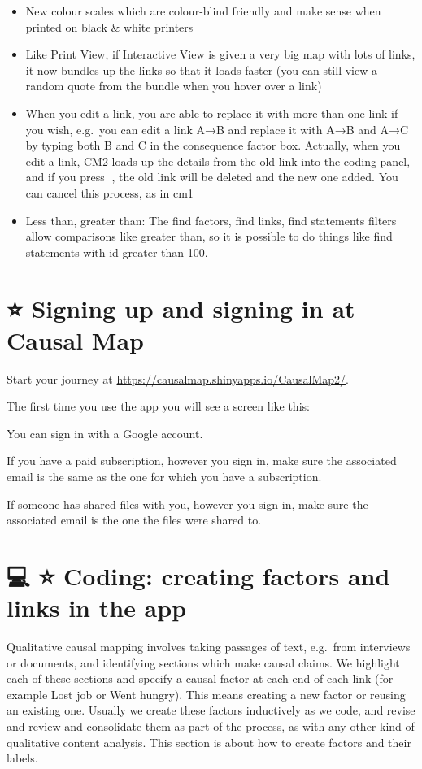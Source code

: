 \documentclass[
]{book}
\begin{document}
\begin{itemize}
\item
  New colour scales which are colour-blind friendly and make sense when printed on black \& white printers
\item
  Like Print View, if Interactive View is given a very big map with lots of links, it now bundles up the links so that it loads faster (you can still view a random quote from the bundle when you hover over a link)
\item
  When you edit a link, you are able to replace it with more than one link if you wish, e.g.~you can edit a link A→B and replace it with A→B and A→C by typing both B and C in the consequence factor box. Actually, when you edit a link, CM2 loads up the details from the old link into the coding panel, and if you press 💾, the old link will be deleted and the new one added. You can cancel this process, as in cm1
\item
  Less than, greater than: The find factors, find links, find statements filters allow comparisons like greater than, so it is possible to do things like find statements with id greater than 100.
\end{itemize}

\hypertarget{signing-up-and-signing-in-at-causal-map}{%
\chapter{⭐ Signing up and signing in at Causal Map}\label{signing-up-and-signing-in-at-causal-map}}

Start your journey at \url{https://causalmap.shinyapps.io/CausalMap2/}.

The first time you use the app you will see a screen like this:

You can sign in with a Google account.

If you have a paid subscription, however you sign in, make sure the associated email is the same as the one for which you have a subscription.

If someone has shared files with you, however you sign in, make sure the associated email is the one the files were shared to.

\hypertarget{coding-creating-factors-and-links-in-the-app}{%
\chapter{💻 ⭐ Coding: creating factors and links in the app}\label{coding-creating-factors-and-links-in-the-app}}

Qualitative causal mapping involves taking passages of text, e.g.~from interviews or documents, and identifying sections which make causal claims. We highlight each of these sections and specify a causal factor at each end of each link (for example Lost job or Went hungry). This means creating a new factor or reusing an existing one. Usually we create these factors inductively as we code, and revise and review and consolidate them as part of the process, as with any other kind of qualitative content analysis. This section is about how to create factors and their labels.
\end{document}
